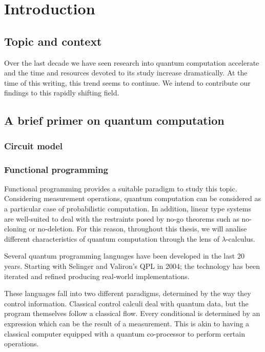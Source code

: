 \chapter{Introduction}

\section{Topic and context}
Over the last decade we have seen research into quantum computation accelerate
and the time and resources devoted to its study increase dramatically. At the
time of this writing, this trend seems to continue. We intend to contribute our
findings to this rapidly shifting field.

\section{A brief primer on quantum computation}


\subsection{Circuit model}


\subsection{Functional programming}
Functional programming provides a suitable paradigm to study this topic. Considering
measurement operations, quantum computation can be considered as a particular case
of probabilistic computation. In addition, linear type systems are well-suited to
deal with the restraints posed by no-go theorems such as no-cloning or no-deletion.
For this reason, throughout this thesis, we will analise different characteristics
of quantum computation through the lens of $\lambda$-calculus.

Several quantum programming languages have been developed in the last 20 years.
Starting with Selinger and Valiron's QPL in 2004\cite{SelingerMSCS04}; the
technology has been iterated and refined producing real-world implementations.

These languages fall into two different paradigms, determined by the way they
control information. Classical control calculi deal with quantum data, but the
program themselves follow a classical flow. Every conditional is determined by
an expression which can be the result of a measurement. This is akin to having
a classical computer equipped with a quantum co-processor to perform certain
operations.

